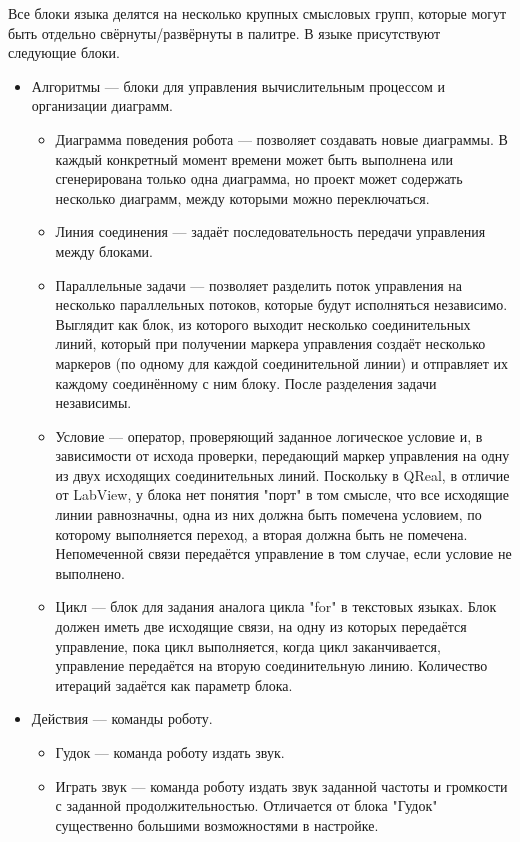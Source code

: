 \documentclass[a4paper]{article}
\begin{document}
Все блоки языка делятся на несколько крупных смысловых групп, которые могут быть отдельно свёрнуты/развёрнуты в палитре. В языке присутствуют следующие блоки.
\begin{itemize}
	\item Алгоритмы --- блоки для управления вычислительным процессом и организации диаграмм.
  \begin{itemize}
    \item Диаграмма поведения робота --- позволяет создавать новые диаграммы. В каждый конкретный момент времени может быть выполнена или сгенерирована только одна диаграмма, но проект может содержать несколько диаграмм, между которыми можно переключаться.
    \item Линия соединения --- задаёт последовательность передачи управления между блоками.
    \item Параллельные задачи --- позволяет разделить поток управления на несколько параллельных потоков, которые будут исполняться независимо. Выглядит как блок, из которого выходит несколько соединительных линий, который при получении маркера управления создаёт несколько маркеров (по одному для каждой соединительной линии) и отправляет их каждому соединённому с ним блоку. После разделения задачи независимы.
    \item Условие --- оператор, проверяющий заданное логическое условие и, в зависимости от исхода проверки, передающий маркер управления на одну из двух исходящих соединительных линий. Поскольку в QReal, в отличие от LabView, у блока нет понятия "порт" в том смысле, что все исходящие линии равнозначны, одна из них должна быть помечена условием, по которому выполняется переход, а вторая должна быть не помечена. Непомеченной связи передаётся управление в том случае, если условие не выполнено.
    \item Цикл --- блок для задания аналога цикла "for" в текстовых языках. Блок должен иметь две исходящие связи, на одну из которых передаётся управление, пока цикл выполняется, когда цикл заканчивается, управление передаётся на вторую соединительную линию. Количество итераций задаётся как параметр блока.
  \end{itemize}
  \item Действия --- команды роботу.
  \begin{itemize}
    \item Гудок --- команда роботу издать звук.
    \item Играть звук --- команда роботу издать звук заданной частоты и громкости с заданной продолжительностью. Отличается от блока "Гудок" существенно большими возможностями в настройке.

\end{itemize}
\end{itemize}
\end{document}
